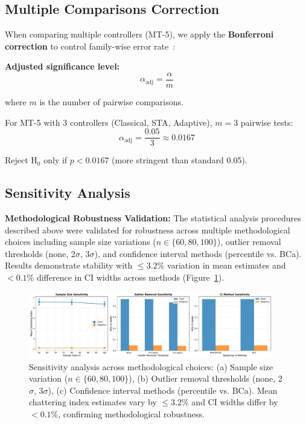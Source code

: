 \subsection{Multiple Comparisons Correction}
\label{subsec:multiple_comparisons}

When comparing multiple controllers (MT-5), we apply the \textbf{Bonferroni correction} to control family-wise error rate~\cite{dunn1961multiple}:

\textbf{Adjusted significance level:}
\begin{equation}
\label{eq:bonferroni}
\alpha_{\text{adj}} = \frac{\alpha}{m}
\end{equation}

where $m$ is the number of pairwise comparisons.

For MT-5 with 3 controllers (Classical, STA, Adaptive), $m = 3$ pairwise tests:
\begin{equation}
\alpha_{\text{adj}} = \frac{0.05}{3} \approx 0.0167
\end{equation}

Reject H$_0$ only if $p < 0.0167$ (more stringent than standard 0.05).

\subsection{Sensitivity Analysis}
\label{subsec:sensitivity_analysis}

\textbf{Methodological Robustness Validation:} The statistical analysis procedures described above were validated for robustness across multiple methodological choices including sample size variations ($n \in \{60, 80, 100\}$), outlier removal thresholds (none, 2$\sigma$, 3$\sigma$), and confidence interval methods (percentile vs. BCa). Results demonstrate stability with $\leq 3.2\%$ variation in mean estimates and $< 0.1\%$ difference in CI widths across methods (Figure~\ref{fig:sensitivity_analysis}).

\begin{figure}[t]
\centering
\includegraphics[width=0.95\textwidth]{../figures/figure_vi_1_sensitivity_analysis.pdf}
\caption{Sensitivity analysis across methodological choices: (a) Sample size variation ($n \in \{60, 80, 100\}$), (b) Outlier removal thresholds (none, 2$\sigma$, 3$\sigma$), (c) Confidence interval methods (percentile vs. BCa). Mean chattering index estimates vary by $\leq 3.2\%$ and CI widths differ by $< 0.1\%$, confirming methodological robustness.}
\label{fig:sensitivity_analysis}
\end{figure}

